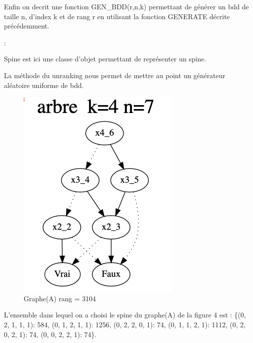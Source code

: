 \documentclass[french]{article}
\begin{document}
\newpage
Enfin on decrit une fonction GEN\_BDD(r,n,k) permettant de générer un bdd de taille n, d'index k et de rang r en utilisant la fonction GENERATE décrite précédemment.

\begin{algorithm}
  \begin{algorithmic}[1]
    \Statex
            \State {}
            \State {}
            \State {}
            \State {}
            \State {}
                \State {}
                :
                    \State {}
                    \State {}
                    \State {}
            \EndFor
  \end{algorithmic}
\end{algorithm}

Spine est ici une classe d'objet permettant de représenter un spine.

La méthode du unranking nous permet de mettre au point un générateur aléatoire uniforme de bdd.

\begin{figure}[h!]
    \centering
    \includegraphics[scale=0.4]{arb_3104.png}
    \caption{Graphe(A) rang = 3104}
    \label{fig:graphe_A}
\end{figure}
L'ensemble dans lequel on a choisi le spine du graphe(A) de la figure 4 est : \{(0, 2, 1, 1, 1): 584, (0, 1, 2, 1, 1): 1256, (0, 2, 2, 0, 1): 74, (0, 1, 1, 2, 1): 1112, (0, 2, 0, 2, 1): 74, (0, 0, 2, 2, 1): 74\}.
\end{document}
